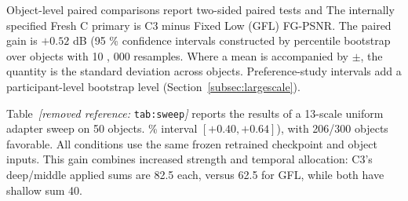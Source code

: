 \documentclass[times,twocolumn,final]{elsarticle}
\providecommand{\DIFadd}[1]{{\protect\color{blue} \sf #1}} %
\providecommand{\DIFdel}[1]{{\protect\color{red} \scriptsize #1}} %
\providecommand{\DIFaddbegin}{} %
\providecommand{\DIFaddend}{} %
\providecommand{\DIFdelbegin}{} %
\providecommand{\DIFdelend}{} %
\begin{document}
\DIFdelbegin %
\DIFdel{Object-level paired comparisons report two-sided paired tests and }\DIFdelend \DIFaddbegin \DIFadd{The internally specified Fresh C primary is C3 minus Fixed Low (GFL) FG-PSNR. The paired gain is $+0.52$ dB (}\DIFaddend 95\DIFdelbegin \DIFdel{\% confidence intervals constructed by percentile bootstrap over objects with 10}%
\DIFdel{,}%
\DIFdel{000 resamples.
Where a mean is accompanied by $\pm$, the quantity is the standard deviation across objects. Preference-study intervals add a participant-level bootstrap level (Section~\ref{subsec:largescale}). }%


\DIFdel{Table~\textit{[removed reference: }\texttt{tab:sweep}\textit{]} reports the results of a 13-scale uniform adapter sweep on 50 objects.
}\DIFdelend \DIFaddbegin \DIFadd{\% interval $[+0.40,+0.64]$), with 206/300 objects favorable. All conditions use the same frozen retrained checkpoint and object inputs. This gain combines increased strength and temporal allocation: C3's deep/middle applied sums are 82.5 each, versus 62.5 for GFL, while both have shallow sum 40.
}\DIFaddend 
\end{document}
